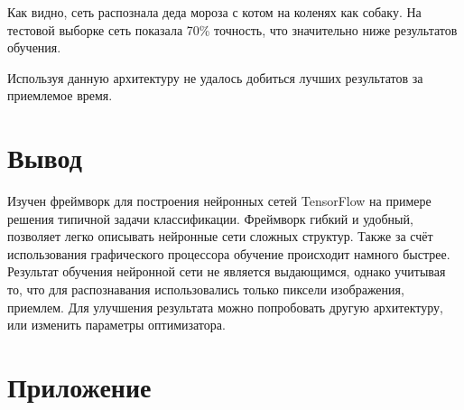 	Как видно, сеть распознала деда мороза с котом на коленях как собаку. На тестовой выборке сеть показала 70\% точность, что значительно ниже результатов обучения.
	
	Используя данную архитектуру не удалось добиться лучших результатов за приемлемое время.

	\FloatBarrier
	\section{Вывод}
	Изучен фреймворк для построения нейронных сетей TensorFlow на примере решения типичной задачи классификации.
	Фреймворк гибкий и удобный, позволяет легко описывать нейронные сети сложных структур.
	Также за счёт использования графического процессора обучение происходит намного быстрее.
	Результат обучения нейронной сети не является выдающимся, однако учитывая то, что для распознавания использовались только пиксели изображения, приемлем.
	Для улучшения результата можно попробовать другую архитектуру, или изменить параметры оптимизатора.
	\newpage
	\section{Приложение}
	